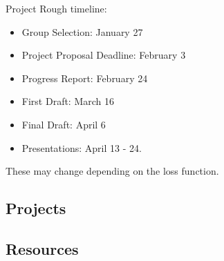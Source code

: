 \documentclass[10pt, handout]{beamer}
\begin{document}
\begin{frame}[fragile]{Project}
Rough timeline: 
\begin{itemize}
\item Group Selection: January 27
\item Project Proposal Deadline: February 3
\item Progress Report: February 24
\item First Draft: March 16
\item Final Draft: April 6
\item Presentations: April 13 - 24.
\end{itemize}
These may change depending on the loss function.
\end{frame}


\subsection{Projects}
\subsection{Resources}
\end{document}
